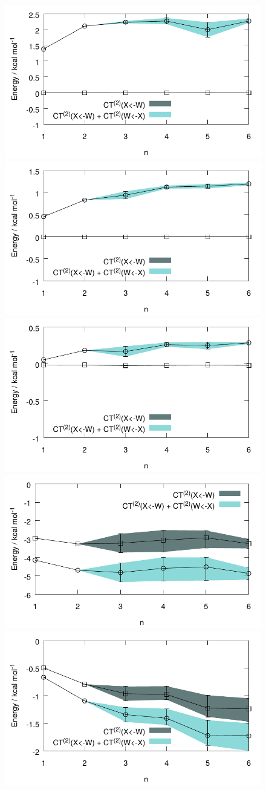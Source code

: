 \begin{sie}
\begin{figure}
 \begin{center}
  \includegraphics[width=0.48\linewidth]{images/ct_energy_data/e2ind_ct2_plots/pdf/li-ct.pdf}
  \includegraphics[width=0.48\linewidth]{images/ct_energy_data/e2ind_ct2_plots/pdf/na-ct.pdf} \\
  \includegraphics[width=0.48\linewidth]{images/ct_energy_data/e2ind_ct2_plots/pdf/k-ct.pdf} 
  \includegraphics[width=0.48\linewidth]{images/ct_energy_data/e2ind_ct2_plots/pdf/f-ct.pdf} \\
  \includegraphics[width=0.48\linewidth]{images/ct_energy_data/e2ind_ct2_plots/pdf/cl-ct.pdf} 

\end{center}
\end{figure}
\end{sie}

